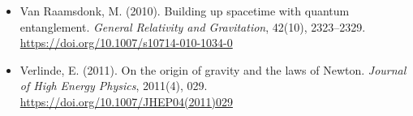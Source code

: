 \documentclass[12pt,a4paper]{article}
\numberwithin{equation}{section}
\begin{document}
\begin{itemize}[leftmargin=0.5in, itemindent=-0.5in, label={}]
\item Van Raamsdonk, M. (2010). Building up spacetime with quantum entanglement. \textit{General Relativity and Gravitation}, 42(10), 2323--2329. \url{https://doi.org/10.1007/s10714-010-1034-0}

\item Verlinde, E. (2011). On the origin of gravity and the laws of Newton. \textit{Journal of High Energy Physics}, 2011(4), 029. \url{https://doi.org/10.1007/JHEP04(2011)029}

\end{itemize}
\end{document}
